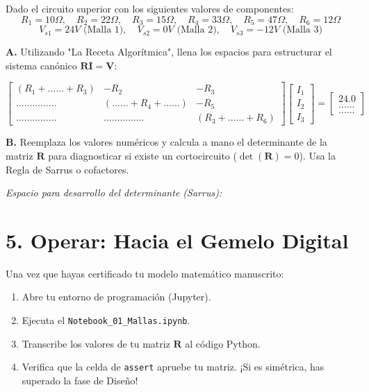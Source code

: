 \documentclass[11pt,a4paper]{article}
\begin{document}
Dado el circuito superior con los siguientes valores de componentes:
$$R_1=10\Omega, \quad R_2=22\Omega, \quad R_3=15\Omega, \quad R_4=33\Omega, \quad R_5=47\Omega, \quad R_6=12\Omega$$
$$V_{s1} = 24V \text{ (Malla 1)}, \quad V_{s2} = 0V \text{ (Malla 2)}, \quad V_{s3} = -12V \text{ (Malla 3)}$$

\textbf{A.} Utilizando "La Receta Algorítmica", llena los espacios para estructurar el sistema canónico $\mathbf{R}\mathbf{I} = \mathbf{V}$:

\vspace{0.5cm}

$$
\begin{bmatrix}
 (R_1 + \dots \dots + R_3) & -R_2 & -R_3 \\
 \dots \dots \dots \dots \dots & (\dots \dots + R_4 + \dots \dots) & -R_5 \\
 \dots \dots \dots \dots \dots & \dots \dots \dots \dots \dots & (R_3 + \dots \dots + R_6)
\end{bmatrix}
\begin{bmatrix}
 I_1 \\
 I_2 \\
 I_3
\end{bmatrix}
=
\begin{bmatrix}
 24.0 \\
 \dots \dots \\
 \dots \dots
\end{bmatrix}
$$

\vspace{0.5cm}

\textbf{B.} Reemplaza los valores numéricos y calcula a mano el determinante de la matriz $\mathbf{R}$ para diagnosticar si existe un cortocircuito ($\det(\mathbf{R}) = 0$). Usa la Regla de Sarrus o cofactores.

\vspace{0.3cm}
\begin{tcolorbox}[colback=white,colframe=UCBgray,height=6cm,valign=top]
\textit{Espacio para desarrollo del determinante (Sarrus):}
\end{tcolorbox}

\section*{5. Operar: Hacia el Gemelo Digital}
Una vez que hayas certificado tu modelo matemático manuscrito:
\begin{enumerate}[label=\textbf{\arabic*.}]
    \item Abre tu entorno de programación (Jupyter).
    \item Ejecuta el \texttt{Notebook\_01\_Mallas.ipynb}.
    \item Transcribe los valores de tu matriz $\mathbf{R}$ al código Python.
    \item Verifica que la celda de \texttt{assert} apruebe tu matriz. ¡Si es simétrica, has superado la fase de Diseño!
\end{enumerate}
\end{document}
